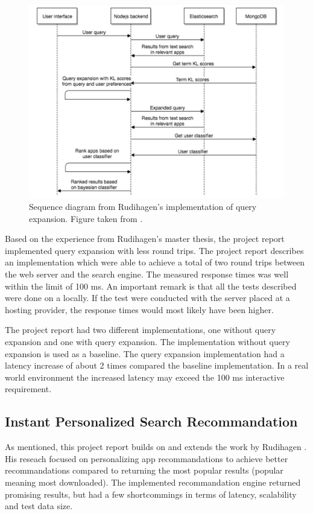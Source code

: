 \begin{figure}[h!]
  \centering \includegraphics[width=1\linewidth]{img/sequence-diagram-rudihagen.png}
  \caption{Sequence diagram from Rudihagen's implementation of query expansion. Figure taken from \cite{master-thesis}.}
  \label{fig:sequence-diagram-rudihagen}
\end{figure}

Based on the experience from Rudihagen's master thesis,
the project report \cite{project-report} implemented query expansion with less round trips.
The project report describes an implementation which were able to achieve a total of two round trips between the web server and the search engine.
The measured response times was well within the limit of 100 ms.
An important remark is that all the tests described were done on a locally.
If the test were conducted with the server placed at a hosting provider,
the response times would most likely have been higher.

The project report had two different implementations, one without query expansion and one with query expansion.
The implementation without query expansion is used as a baseline.
The query expansion implementation had a latency increase of about 2 times compared the baseline implementation.
In a real world environment the increased latency may exceed the 100 ms interactive requirement.

\subsection{Instant Personalized Search Recommandation}
As mentioned, this project report builds on and extends the work by Rudihagen \cite{master-thesis}.
His reseach focused on personalizing app recommandations to achieve better recommandations compared to returning the most popular results (popular meaning most downloaded).
The implemented recommandation engine returned promising results, but had a few shortcommings in terms of latency, scalability and test data size.

